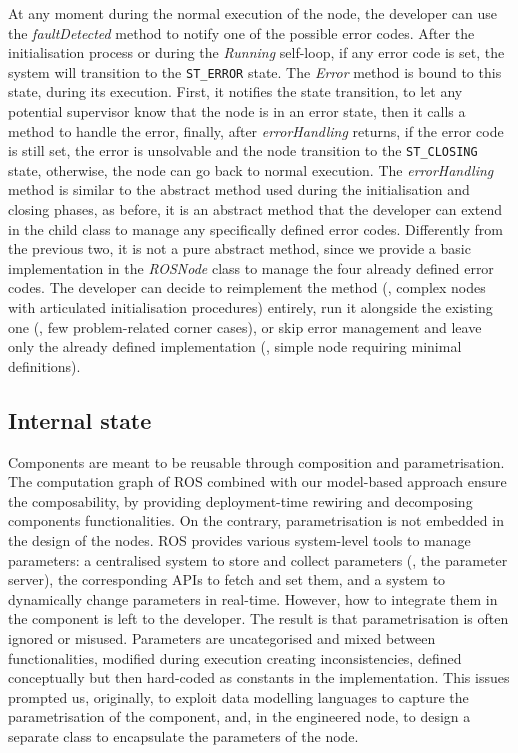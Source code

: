 At any moment during the normal execution of the node, the developer can use the \textit{faultDetected} method to notify one of the possible error codes. After the initialisation process or during the \textit{Running} self-loop, if any error code is set, the system will transition to the  \texttt{ST\_ERROR} state. The \textit{Error} method is bound to this state, during its execution. First, it notifies the state transition, to let any potential supervisor know that the node is in an error state, then it calls a method to handle the error, finally, after \textit{errorHandling} returns, if the error code is still set, the error is unsolvable and the node transition to the \texttt{ST\_CLOSING} state, otherwise, the node can go back to normal execution. The \textit{errorHandling} method is similar to the abstract method used during the initialisation and closing phases, as before, it is an abstract method that the developer can extend in the child class to manage any specifically defined error codes. Differently from the previous two, it is not a pure abstract method, since we provide a basic implementation in the \textit{ROSNode} class to manage the four already defined error codes. The developer can decide to reimplement the method (\eg, complex nodes with articulated initialisation procedures) entirely, run it alongside the existing one (\eg, few problem-related corner cases), or skip error management and leave only the already defined implementation (\eg, simple node requiring minimal definitions).

\subsection{Internal state}
Components are meant to be reusable through composition and parametrisation. The computation graph of ROS combined with our model-based approach ensure the composability, by providing deployment-time rewiring and decomposing components functionalities. On the contrary, parametrisation is not embedded in the design of the nodes. ROS provides various system-level tools to manage parameters: a centralised system to store and collect parameters (\ie, the parameter server), the corresponding APIs to fetch and set them, and a system to dynamically change parameters in real-time. However, how to integrate them in the component is left to the developer. The result is that parametrisation is often ignored or misused. Parameters are uncategorised and mixed between functionalities, modified during execution creating inconsistencies, defined conceptually but then hard-coded as constants in the implementation. This issues prompted us, originally, to exploit data modelling languages to capture the parametrisation of the component, and, in the engineered node, to design a separate class to encapsulate the parameters of the node.

